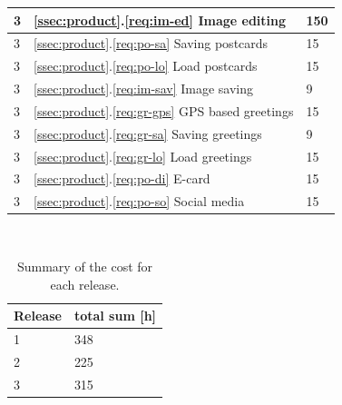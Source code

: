 \documentclass[10pt,a4paper]{article}
\begin{document}
\begin{table}[h!]
\begin{tabular}{| l | l | l | }
3 & \ref{ssec:product}.\ref{req:im-ed} Image editing & 150\\ \hline
3 & \ref{ssec:product}.\ref{req:po-sa} Saving postcards & 15\\ \hline
3 & \ref{ssec:product}.\ref{req:po-lo} Load postcards & 15\\ \hline
3 & \ref{ssec:product}.\ref{req:im-sav} Image saving & 9\\ \hline
3 & \ref{ssec:product}.\ref{req:gr-gps} GPS based greetings &15\\ \hline
3 & \ref{ssec:product}.\ref{req:gr-sa} Saving greetings & 9\\ \hline
3 & \ref{ssec:product}.\ref{req:gr-lo} Load greetings & 15\\ \hline
3 & \ref{ssec:product}.\ref{req:po-di} E-card &15\\ \hline
3 & \ref{ssec:product}.\ref{req:po-so} Social media &15\\ \hline
\end{tabular}\\
\end{table}

\begin{table}[h!]
\centering
\caption{Summary of the cost for each release.}
\label{table:SumRelease}
\begin{tabular}{| l | l |} \hline
\textbf{Release} & \textbf{total sum [h]} \\ \hline

1 &  348 \\ \hline
2 & 225 \\ \hline
3 & 315 \\ \hline
\end{tabular}\\
\end{table}
\end{document}
